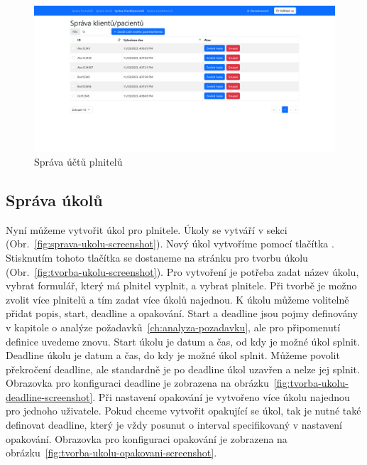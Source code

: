 \begin{figure}[H]
    \includegraphics[width=\textwidth]{../img/screenshots/sprava-plnitelu}
    \caption{Správa účtů plnitelů}\label{fig:sprava-plnitelu-screenshot}
\end{figure}

\subsection{Správa úkolů}\label{subsec:sprava-ukolu}

Nyní můžeme vytvořit úkol pro plnitele.
Úkoly se vytváří v sekci  (Obr.\ \ref{fig:sprava-ukolu-screenshot}).
Nový úkol vytvoříme pomocí tlačítka .
Stisknutím tohoto tlačítka se dostaneme na stránku pro tvorbu úkolu (Obr.\ \ref{fig:tvorba-ukolu-screenshot}).
Pro vytvoření je potřeba zadat název úkolu, vybrat formulář, který má plnitel vyplnit, a vybrat plnitele.
Při tvorbě je možno zvolit více plnitelů a tím zadat více úkolů najednou.
K úkolu můžeme volitelně přidat popis, start, deadline a opakování.
Start a deadline jsou pojmy definovány v kapitole o analýze požadavků~\ref{ch:analyza-pozadavku}, ale pro připomenutí definice uvedeme znovu.
Start úkolu je datum a čas, od kdy je možné úkol splnit.
Deadline úkolu je datum a čas, do kdy je možné úkol splnit.
Můžeme povolit překročení deadline, ale standardně je po deadline úkol uzavřen a nelze jej splnit.
Obrazovka pro konfiguraci deadline je zobrazena na obrázku~\ref{fig:tvorba-ukolu-deadline-screenshot}.
Při nastavení opakování je vytvořeno více úkolu najednou pro jednoho uživatele.
Pokud chceme vytvořit opakující se úkol, tak je nutné také definovat deadline, který je vždy posunut o interval specifikovaný v nastavení opakování.
Obrazovka pro konfiguraci opakování je zobrazena na obrázku~\ref{fig:tvorba-ukolu-opakovani-screenshot}.

